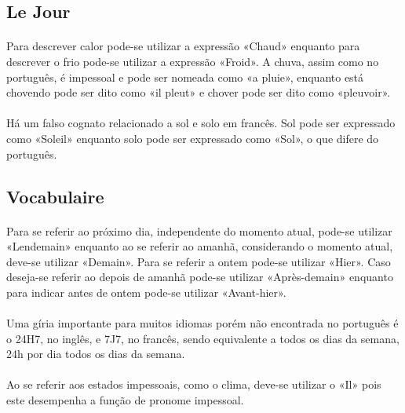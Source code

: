 \documentclass{article}
\begin{document}
    \subsection{Le Jour}
        \paragraph{}Para descrever calor pode-se utilizar a expressão «Chaud» enquanto para descrever o frio pode-se utilizar a expressão «Froid». A chuva, assim como no português, é impessoal e pode ser nomeada como «a pluie», enquanto está chovendo pode ser dito como «il pleut» e chover pode ser dito como «pleuvoir».
        
        \paragraph{}Há um falso cognato relacionado a sol e solo em francês. Sol pode ser expressado como «Soleil» enquanto solo pode ser expressado como «Sol», o que difere do português.
           
    \subsection{Vocabulaire}
        \paragraph{}Para se referir ao próximo dia, independente do momento atual, pode-se utilizar «Lendemain» enquanto ao se referir ao amanhã, considerando o momento atual, deve-se utilizar «Demain». Para se referir a ontem pode-se utilizar «Hier». Caso deseja-se referir ao depois de amanhã pode-se utilizar «Après-demain» enquanto para indicar antes de ontem pode-se utilizar «Avant-hier».
        
        \paragraph{}Uma gíria importante para muitos idiomas porém não encontrada no português é o 24H7, no inglês, e 7J7, no francês, sendo equivalente a todos os dias da semana, 24h por dia todos os dias da semana.
        
        \paragraph{}Ao se referir aos estados impessoais, como o clima, deve-se utilizar o «Il» pois este desempenha a função de pronome impessoal.
\newpage
\end{document}

